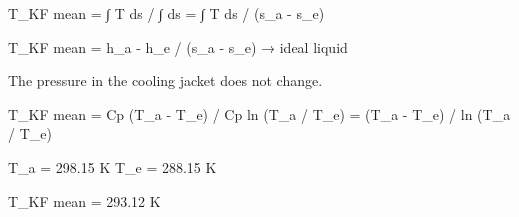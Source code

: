 T_KF mean = ∫ T ds / ∫ ds = ∫ T ds / (s_a - s_e)  

T_KF mean = h_a - h_e / (s_a - s_e) → ideal liquid  

The pressure in the cooling jacket does not change.  

T_KF mean = Cp (T_a - T_e) / Cp ln (T_a / T_e) = (T_a - T_e) / ln (T_a / T_e)  

T_a = 298.15 K  
T_e = 288.15 K  

T_KF mean = 293.12 K